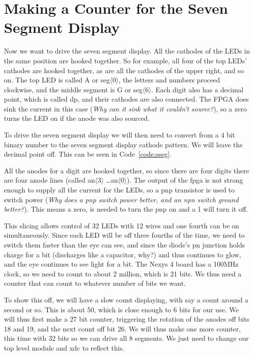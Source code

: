\section{Making a Counter for the Seven Segment Display}

Now we want to drive the seven segment display.  All the cathodes of the LEDs in the same position are hooked together.  So for example, all four of the top LEDs' cathodes are hooked together, as are all the cathodes of the upper right, and so on.  The top LED is called A or seg$\langle 0\rangle$, the letters and numbers proceed clockwise, and the middle segment is G or seg$\langle 6\rangle$.  Each digit also has a decimal point, which is called dp, and their cathodes are also connected.   The FPGA does sink the current in this case (\emph{Why can it sink what it couldn't source?}), so a zero turns the LED on if the anode was also sourced.

To drive the seven segment display we will then need to convert from a 4 bit binary number to the seven segment display cathode pattern.  We will leave the decimal point off.  This can be seen in Code~\ref{code:sseg}.


All the anodes for a digit are hooked together, so since there are four digits there are four anode lines (called an$\langle 3\rangle$ \ldots an$\langle 0\rangle$).  The output of the fpga is not strong enough to supply all the current for the LEDs, so a pnp transistor is used to switch power (\emph{Why does a pnp switch power better, and an npn switch ground better?}).  This means a zero, is needed to turn the pnp on and a 1 will turn it off.

This slicing allows control of 32 LEDs with 12 wires and one fourth can be on simultaneously.  Since each LED will be off three fourths of the time, we need to switch them faster than the eye can see, and since the diode's pn junction holds charge for a bit (discharges like a capacitor, why?) and thus continues to glow, and the eye continues to see light for a bit.  The Nexys 4 board has a 100MHz clock, so we need to count to about 2 million, which is 21 bits.  We thus need a counter that can count to whatever number of bits we want.


To show this off, we will have a slow count displaying, with say a count around a second or so.  This is about 50, which is close enough to 6 bits for our use.  We will thus first make a 27 bit counter, triggering the rotation of the anodes off bits 18 and 19, and the next count off bit 26.  We will thus make one more counter, this time with 32 bits so we can drive all 8 segments.  We just need to change our top level module and xdc to reflect this.

